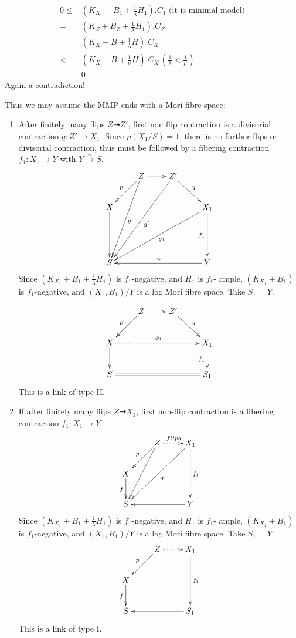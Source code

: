 \documentclass{article}
\begin{document}
\begin{enumerate}[(A)]
\begin{enumerate}[a)]
    \begin{equation*}
      \begin{aligned}
        0\leqslant& (K_{X_1}+B_1+\frac{1}{\lambda}H_1).C_1 \text{ (it is minimal model)}\\
        =&(K_{Z}+B_{Z}+\frac{1}{\lambda}H_1).C_{Z}\\
        = &(K_X+B+\frac{1}{\lambda}H).C_X\\
        <&(K_{X}+B+\frac{1}{\mu}H).C_X  \,(\frac{1}{\lambda}<\frac{1}{\mu})\\
        =&0
      \end{aligned}
    \end{equation*} 
  Again  a contradiction!
  \end{enumerate}  
  Thus we may assume the MMP ends with a Mori fibre space:
  \begin{enumerate}[1)]
    \item After finitely many flips $ Z\dashrightarrow Z' $, first non flip contraction is a divisorial contraction $ q:Z'\to X_1 $. Since $ \rho(X_1/S)=1 $, there is no further flips or divisorial contraction, thus must be followed by a fibering contraction $ f_1:X_1\to Y $ with $ Y\xrightarrow{\sim}S $.
    \[ \xymatrix{
      &Z\ar[lddd]^g\ar[ld]_p\ar@{.>}[r]&Z'\ar[dr]^{q}\ar[llddd]^{g'}&\\
      X\ar[dd]&&&X_1\ar[dd]_{f_1}\ar[ddlll]^{g_1}\\
      &&&\\
      S&&&Y\ar[lll]_{\sim}} \]
    Since $ (K_{X_1}+B_1+\frac{1}{\lambda}H_1) $ is $ f_1 $-negative, and $ H_1 $ is $ f_1 $- ample, $ (K_{X_1}+B_1) $ is $ f_1 $-negative, and $ (X_1,B_1)/Y $ is a log Mori fibre space.  Take $ S_1=Y $.
    
    \[ \xymatrix{
      &Z\ar[ld]_p\ar@{.>}[r]&Z'\ar[dr]^{q}&\\
      X\ar[d]\ar@{.>}[rrr]^{\psi_1}&&&X_1\ar[d]_{f_1}\\
      S\ar@{=}[rrr]&&&S_1} \]
    This is a link of type II.
    \item If after finitely many flips $ Z\dashrightarrow X_1 $, first non-flip contraction is a fibering contraction $ f_1:X_1\to Y  $ 
    \[ \xymatrix{
      &Z\ar[ld]_p\ar[ldd]\ar@{.>}[r]^{flips}&X_1\ar[lldd]^{g_1}\ar[dd]^{f_1}\\
      X\ar[d]_f&&\\
      S &&Y\ar[ll]}\]
    Since $ (K_{X_1}+B_1+\frac{1}{\lambda}H_1) $ is $ f_1 $-negative, and $ H_1 $ is $ f_1 $- ample, $ (K_{X_1}+B_1) $ is $ f_1 $-negative, and $ (X_1,B_1)/Y $ is a log Mori fibre space.  Take $ S_1=Y $.
    \[
      \xymatrix{
      &Z\ar[ld]_p\ar@{.>}[r]&X_1\ar[dd]^{f_1}\\
        X\ar[d]_f&&\\
      S &&S_1\ar[ll]}
    \]
    This is a link of type I.
  \end{enumerate} 
\end{enumerate}
\end{document}
